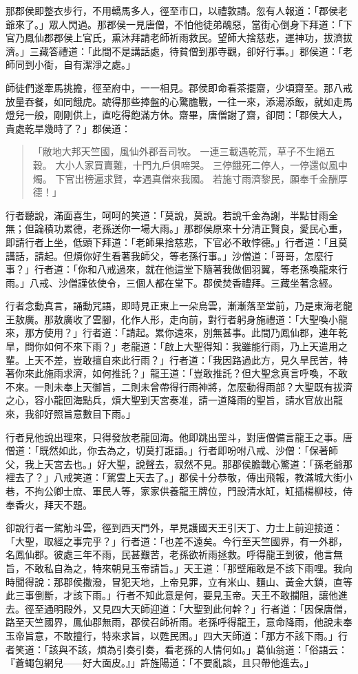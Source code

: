那郡侯即整衣步行，不用轎馬多人，徑至市口，以禮敦請。忽有人報道：「郡侯老爺來了。」眾人閃過。那郡侯一見唐僧，不怕他徒弟醜惡，當街心倒身下拜道：「下官乃鳳仙郡郡侯上官氏，熏沐拜請老師祈雨救民。望師大捨慈悲，運神功，拔濟拔濟。」三藏答禮道：「此間不是講話處，待貧僧到那寺觀，卻好行事。」郡侯道：「老師同到小衙，自有潔淨之處。」

師徒們遂牽馬挑擔，徑至府中，一一相見。郡侯即命看茶擺齋，少頃齋至。那八戒放量吞餐，如同餓虎。諕得那些捧盤的心驚膽戰，一往一來，添湯添飯，就如走馬燈兒一般，剛剛供上，直吃得飽滿方休。齋畢，唐僧謝了齋，卻問：「郡侯大人，貴處乾旱幾時了？」郡侯道：
\begin{quote}
「敝地大邦天竺國，風仙外郡吾司牧。
一連三載遇乾荒，草子不生絕五穀。
大小人家買賣難，十門九戶俱啼哭。
三停餓死二停人，一停還似風中燭。
下官出榜遍求賢，幸遇真僧來我國。
若施寸雨濟黎民，願奉千金酬厚德！」
\end{quote}

行者聽說，滿面喜生，呵呵的笑道：「莫說，莫說。若說千金為謝，半點甘雨全無；但論積功累德，老孫送你一場大雨。」那郡侯原來十分清正賢良，愛民心重，即請行者上坐，低頭下拜道：「老師果捨慈悲，下官必不敢悖德。」行者道：「且莫講話，請起。但煩你好生看著我師父，等老孫行事。」沙僧道：「哥哥，怎麼行事？」行者道：「你和八戒過來，就在他這堂下隨著我做個羽翼，等老孫喚龍來行雨。」八戒、沙僧謹依使令，三個人都在堂下。郡侯焚香禮拜。三藏坐著念經。

行者念動真言，誦動咒語，即時見正東上一朵烏雲，漸漸落至堂前，乃是東海老龍王敖廣。那敖廣收了雲腳，化作人形，走向前，對行者躬身施禮道：「大聖喚小龍來，那方使用？」行者道：「請起。累你遠來，別無甚事。此間乃鳳仙郡，連年乾旱，問你如何不來下雨？」老龍道：「啟上大聖得知：我雖能行雨，乃上天遣用之輩。上天不差，豈敢擅自來此行雨？」行者道：「我因路過此方，見久旱民苦，特著你來此施雨求濟，如何推託？」龍王道：「豈敢推託？但大聖念真言呼喚，不敢不來。一則未奉上天御旨，二則未曾帶得行雨神將，怎麼動得雨部？大聖既有拔濟之心，容小龍回海點兵，煩大聖到天宮奏准，請一道降雨的聖旨，請水官放出龍來，我卻好照旨意數目下雨。」

行者見他說出理來，只得發放老龍回海。他即跳出罡斗，對唐僧備言龍王之事。唐僧道：「既然如此，你去為之，切莫打誑語。」行者即吩咐八戒、沙僧：「保著師父，我上天宮去也。」好大聖，說聲去，寂然不見。那郡侯膽戰心驚道：「孫老爺那裡去了？」八戒笑道：「駕雲上天去了。」郡侯十分恭敬，傳出飛報，教滿城大街小巷，不拘公卿士庶、軍民人等，家家供養龍王牌位，門設清水缸，缸插楊柳枝，侍奉香火，拜天不題。

卻說行者一駕觔斗雲，徑到西天門外，早見護國天王引天丁、力士上前迎接道：「大聖，取經之事完乎？」行者道：「也差不遠矣。今行至天竺國界，有一外郡，名鳳仙郡。彼處三年不雨，民甚艱苦，老孫欲祈雨拯救。呼得龍王到彼，他言無旨，不敢私自為之，特來朝見玉帝請旨。」天王道：「那壁廂敢是不該下雨哩。我向時聞得說：那郡侯撒潑，冒犯天地，上帝見罪，立有米山、麵山、黃金大鎖，直等此三事倒斷，才該下雨。」行者不知此意是何，要見玉帝。天王不敢攔阻，讓他進去。徑至通明殿外，又見四大天師迎道：「大聖到此何幹？」行者道：「因保唐僧，路至天竺國界，鳳仙郡無雨，郡侯召師祈雨。老孫呼得龍王，意命降雨，他說未奉玉帝旨意，不敢擅行，特來求旨，以甦民困。」四大天師道：「那方不該下雨。」行者笑道：「該與不該，煩為引奏引奏，看老孫的人情何如。」葛仙翁道：「俗語云：『蒼蠅包網兒——好大面皮。』」許旌陽道：「不要亂談，且只帶他進去。」

